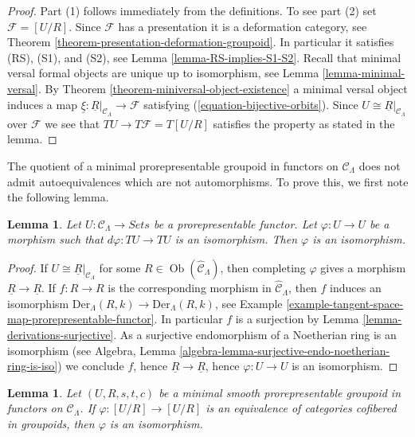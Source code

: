 \documentclass{stacks-project}
\theoremstyle{plain}
\newtheorem{lemma}[subsection]{Lemma}
\theoremstyle{definition}
\theoremstyle{remark}
\numberwithin{equation}{subsection}
\def\Ob{\mathop{\mathrm{Ob}}\nolimits}
\begin{document}
\begin{proof}
Part (1) follows immediately from the definitions.
To see part (2) set $\mathcal{F} = [U/R]$. Since $\mathcal{F}$
has a presentation it is a deformation category, see
Theorem \ref{theorem-presentation-deformation-groupoid}.
In particular it satisfies (RS), (S1), and (S2), see
Lemma \ref{lemma-RS-implies-S1-S2}.
Recall that minimal versal formal objects are unique up to isomorphism, see
Lemma \ref{lemma-minimal-versal}.
By
Theorem \ref{theorem-miniversal-object-existence}
a minimal versal object induces a map
$\underline{\xi} : \underline{R}|_{\mathcal{C}_\Lambda} \to \mathcal{F}$
satisfying (\ref{equation-bijective-orbits}). Since
$U \cong \underline{R}|_{\mathcal{C}_\Lambda}$ over $\mathcal{F}$
we see that $TU \to T\mathcal{F} = T[U/R]$ satisfies the property
as stated in the lemma.
\end{proof}

\noindent
The quotient of a minimal prorepresentable groupoid in functors on $\mathcal
C_\Lambda$ does not admit autoequivalences which are not automorphisms.  To
prove this, we first note the following lemma.

\begin{lemma}
\label{lemma-surjective-morphism-prorepresentable-functor}
Let $U: \mathcal{C}_\Lambda \to \textit{Sets}$ be a
prorepresentable functor. Let $\varphi : U \to U$ be a morphism such
that $d\varphi : TU \to TU$ is an isomorphism.  Then $\varphi$ is an
isomorphism.
\end{lemma}

\begin{proof}
If $U \cong \underline{R}|_{\mathcal{C}_\Lambda}$ for some
$R \in \Ob(\widehat{\mathcal{C}}_\Lambda)$,
then completing $\varphi$ gives a morphism $\underline{R} \to \underline{R}$.
If $f: R \to R$ is the corresponding morphism in
$\widehat{\mathcal{C}}_\Lambda$, then $f$ induces an isomorphism
$\text{Der}_\Lambda(R, k) \to \text{Der}_\Lambda(R, k)$, see
Example \ref{example-tangent-space-map-prorepresentable-functor}.
In particular $f$ is a surjection by
Lemma \ref{lemma-derivations-surjective}.
As a surjective endomorphism of a Noetherian ring is an isomorphism (see
Algebra, Lemma \ref{algebra-lemma-surjective-endo-noetherian-ring-is-iso})
we conclude $f$, hence $\underline{R}
\to \underline{R}$, hence $\varphi : U \to U$
is an isomorphism.
\end{proof}

\begin{lemma}
\label{lemma-minimal-prorepresentable-groupoid-autoequivalence}
Let $(U, R, s, t, c)$ be a minimal smooth prorepresentable groupoid in
functors on $\mathcal{C}_\Lambda$. If $\varphi : [U/R] \to [U/R]$ is an
equivalence of categories cofibered in groupoids, then $\varphi$ is an
isomorphism.
\end{lemma}
\end{document}
